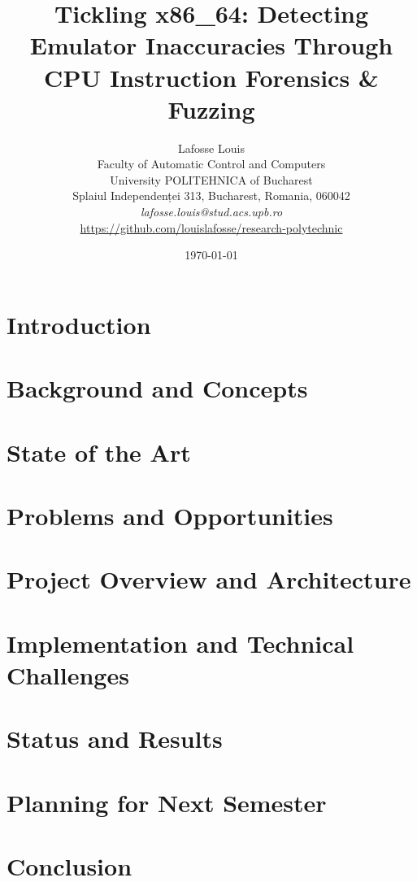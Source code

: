 \documentclass[12pt]{article}
\title{Tickling x86\_64: Detecting Emulator Inaccuracies Through CPU Instruction Forensics \& Fuzzing}
\author{Lafosse Louis\\
Faculty of Automatic Control and Computers\\
University POLITEHNICA of Bucharest\\
Splaiul Independenței 313, Bucharest, Romania, 060042 \\
\emph{lafosse.louis@stud.acs.upb.ro}\\
\vspace{0.3cm}
\small\url{https://github.com/louislafosse/research-polytechnic}}
\date{\today}
\begin{document}
\maketitle

\begin{abstract}

\end{abstract}

\section{Introduction}
\label{sec:introduction}


\section{Background and Concepts}
\label{sec:background}


\section{State of the Art}
\label{sec:stateofart}


\section{Problems and Opportunities}
\label{sec:problems}


\section{Project Overview and Architecture}
\label{sec:architecture}


\section{Implementation and Technical Challenges}
\label{sec:implementation}


\section{Status and Results}
\label{sec:results}


\section{Planning for Next Semester}
\label{sec:planning}


\section{Conclusion}
\label{sec:conclusion}




\end{document}

